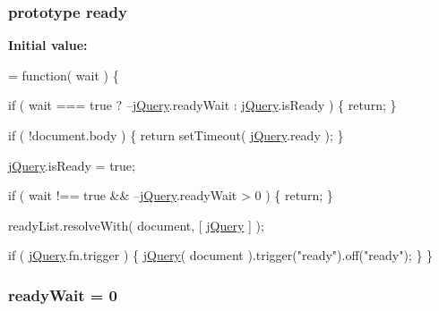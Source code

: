 \subsubsection[{ready}]{ {\bf prototype} ready}\label{jquery-1_810_82-vsdoc_8js_afcf7497803a32ea161cd2c7c5345c0ec}
{\bfseries Initial value\+:}
\begin{DoxyCode}
= \textcolor{keyword}{function}( wait ) \{


        
        \textcolor{keywordflow}{if} ( wait === \textcolor{keyword}{true} ? --\hyperlink{jquery-1_810_82-vsdoc_8js_add5237586d970a38a81f990e8eb28c6c}{jQuery}.readyWait : \hyperlink{jquery-1_810_82-vsdoc_8js_add5237586d970a38a81f990e8eb28c6c}{jQuery}.isReady ) \{
            \textcolor{keywordflow}{return};
        \}

        
        \textcolor{keywordflow}{if} ( !document.body ) \{
            \textcolor{keywordflow}{return} setTimeout( \hyperlink{jquery-1_810_82-vsdoc_8js_add5237586d970a38a81f990e8eb28c6c}{jQuery}.ready );
        \}

        
        \hyperlink{jquery-1_810_82-vsdoc_8js_add5237586d970a38a81f990e8eb28c6c}{jQuery}.isReady = \textcolor{keyword}{true};

        
        \textcolor{keywordflow}{if} ( wait !== \textcolor{keyword}{true} && --\hyperlink{jquery-1_810_82-vsdoc_8js_add5237586d970a38a81f990e8eb28c6c}{jQuery}.readyWait > 0 ) \{
            \textcolor{keywordflow}{return};
        \}

        
        readyList.resolveWith( document, [ \hyperlink{jquery-1_810_82-vsdoc_8js_add5237586d970a38a81f990e8eb28c6c}{jQuery} ] );

        
        \textcolor{keywordflow}{if} ( \hyperlink{jquery-1_810_82-vsdoc_8js_add5237586d970a38a81f990e8eb28c6c}{jQuery}.fn.trigger ) \{
            \hyperlink{jquery-1_810_82-vsdoc_8js_add5237586d970a38a81f990e8eb28c6c}{jQuery}( document ).trigger(\textcolor{stringliteral}{"ready"}).off(\textcolor{stringliteral}{"ready"});
        \}
    \}
\end{DoxyCode}
\hypertarget{jquery-1_810_82-vsdoc_8js_aeb394066cf5f3ce501b86e49d9f68da7}{}
\subsubsection[{ready\+Wait}]{ ready\+Wait = 0}\label{jquery-1_810_82-vsdoc_8js_aeb394066cf5f3ce501b86e49d9f68da7}
\hypertarget{jquery-1_810_82-vsdoc_8js_a2bed23308c25c53346bbe769c1f6f9a5}{}
